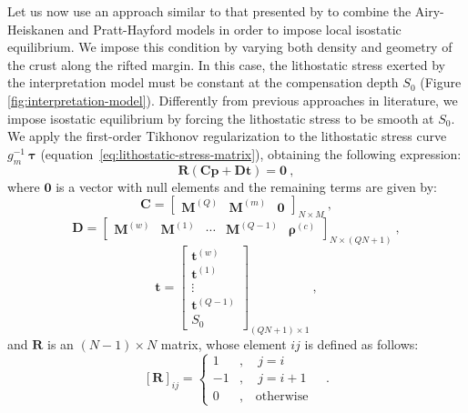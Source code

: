 \documentclass[manuscript]{geophysics}
\begin{document}
Let us now use an approach similar to that presented by \citet{ferderer-etal2017}
to combine the Airy-Heiskanen and Pratt-Hayford models \citep{heiskanen-moritz1967} 
in order to impose local isostatic equilibrium.
We impose this condition by varying both density and geometry of the crust along the 
rifted margin.
In this case, the lithostatic stress exerted by the interpretation model
must be constant at the compensation depth $S_{0}$
(Figure \ref{fig:interpretation-model}).
Differently from previous approaches in literature, we impose isostatic equilibrium 
by forcing the lithostatic stress to be smooth at $S_{0}$.
We apply the first-order Tikhonov regularization
\citep{aster-etal2005} to the lithostatic stress curve $g_{m}^{-1} \: \boldsymbol{\tau}$
(equation~\ref{eq:lithostatic-stress-matrix}), obtaining the
following expression:
\begin{equation}
\mathbf{R} \left( \mathbf{C} \mathbf{p} + \mathbf{D} \mathbf{t} \right) = \mathbf{0} 
\: ,
\label{eq:tik1-lithostatic-stress}
\end{equation}
where $\mathbf{0}$ is a vector with null elements and the remaining terms are given by:
\begin{equation}
\mathbf{C} = \begin{bmatrix}
\mathbf{M}^{(Q)} & \mathbf{M}^{(m)} & \mathbf{0}
\end{bmatrix}_{N \times M} \: ,
\label{eq:matrix-C}
\end{equation}
\begin{equation}
\mathbf{D} = \begin{bmatrix}
\mathbf{M}^{(w)} & \mathbf{M}^{(1)} & \cdots & \mathbf{M}^{(Q-1)} &
\boldsymbol{\rho}^{(c)}
\end{bmatrix}_{N \times \left( QN + 1 \right)} \: ,
\label{eq:matrix-D}
\end{equation}
\begin{equation}
\mathbf{t} = \begin{bmatrix}
\mathbf{t}^{(w)} \\ \mathbf{t}^{(1)} \\ \vdots \\ \mathbf{t}^{(Q-1)} \\ S_{0}
\end{bmatrix}_{\left( QN + 1 \right) \times 1}\: ,
\label{eq:vector-t}
\end{equation}
and $\mathbf{R}$ is an $\left( N-1 \right) \times N$ matrix, whose element 
$ij$ is defined as follows:
\begin{equation}
\left[ \mathbf{R} \right]_{ij} = \begin{cases}
1 &, \quad j = i \\
-1 &, \quad j = i + 1 \\
0 &, \quad \text{otherwise}
\end{cases} \quad .
\label{eq:matrix-R}
\end{equation}
\end{document}
